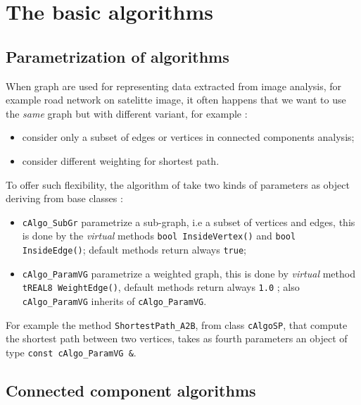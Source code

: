 \section{The basic algorithms}
\label{Graph:Algo}


\subsection{Parametrization of algorithms}

When graph are used for representing data extracted from image analysis, for example road
network on satelitte image, it often happens that we want to use the \emph{same} graph 
but with different variant, for example :

\begin{itemize}
    \item  consider only a subset of edges or vertices in connected components analysis;
    \item  consider different weighting for shortest path.
\end{itemize}

To offer such flexibility, the algorithm of \PPP take two kinds of parameters as object
deriving from base classes :

\begin{itemize}
    \item   {\tt cAlgo\_SubGr} parametrize a sub-graph, i.e a subset of vertices and edges,
            this is done by the \emph{virtual} methods {\tt bool InsideVertex()} and {\tt bool InsideEdge()};
            default methods return always {\tt true};

    \item   {\tt cAlgo\_ParamVG} parametrize a weighted graph, this is done by  \emph{virtual} method
            {\tt tREAL8 WeightEdge()}, default methods return always {\tt 1.0} ;
            also {\tt cAlgo\_ParamVG} inherits of  {\tt cAlgo\_ParamVG}.
\end{itemize}

For example the method {\tt ShortestPath\_A2B}, from class {\tt cAlgoSP}, that compute the shortest path
between two vertices, takes as fourth parameters an object of type {\tt const cAlgo\_ParamVG \&}.



\subsection{Connected component algorithms}

